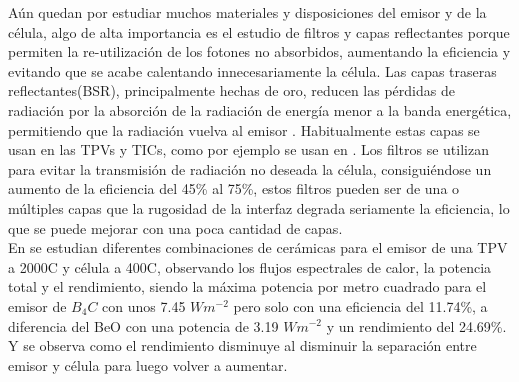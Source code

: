 Aún quedan por estudiar muchos materiales y disposiciones del emisor y de la célula, algo de alta importancia es el estudio de filtros y capas reflectantes porque permiten la re-utilización de los fotones no absorbidos, aumentando la eficiencia y evitando que se acabe calentando innecesariamente la célula. Las capas traseras reflectantes(BSR), principalmente hechas de oro, reducen las pérdidas de radiación por la absorción de la radiación de energía menor a la banda energética, permitiendo que la radiación vuelva al emisor \cite{nTPV_Review}. Habitualmente estas capas se usan en las TPVs y TICs, como por ejemplo se usan en \cite{thermoionic_TPV_NF,modelEfficiency_NF_TPV,thermophotovoltaic_40}. Los filtros se utilizan para evitar la transmisión de radiación no deseada  la célula, consiguiéndose un aumento de la eficiencia del 45\% al 75\%, estos filtros pueden ser de una o múltiples capas que la rugosidad de la interfaz degrada seriamente la eficiencia, lo que se puede mejorar con una poca cantidad de capas\cite{multiLayerFilters}.\\

En \cite{differentEmitterCeramics} se estudian diferentes combinaciones de cerámicas para el emisor de una TPV a 2000\textdegree C y célula a 400\textdegree C, observando los flujos espectrales de calor, la potencia total y el rendimiento, siendo la máxima potencia por metro cuadrado para el emisor de $B_4C$ con unos 7.45 $Wm^{-2}$ pero solo con una eficiencia del 11.74\%, a diferencia del BeO con una potencia de 3.19 $Wm^{-2}$ y un rendimiento del 24.69\%. Y se observa como el rendimiento disminuye al disminuir la separación entre emisor y célula para luego volver a aumentar.\\

